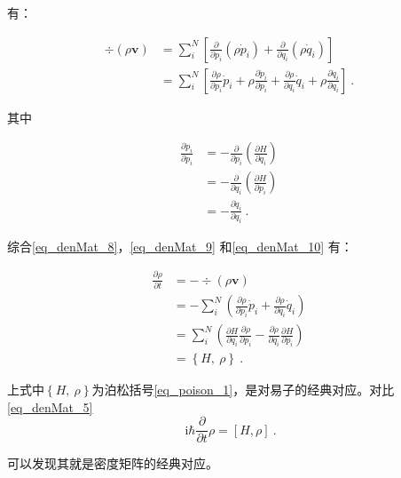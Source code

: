 有：

\begin{equation}\label{eq_denMat_9}
\begin{aligned}
\div\left(\rho\mathbf{v}\right)&= \sum_i^N\left[
    \frac{\partial}{\partial p_i}\left( \rho \dot{p}_i \right) + 
    \frac{\partial}{\partial q_i}\left( \rho \dot{q}_i \right)
    \right] \\
&=\sum_i^N\left[
    \frac{\partial\rho}{\partial p_i}\dot{p}_i +
    \rho \frac{\partial \dot{p}_i}{\partial p_i} +
    \frac{\partial\rho}{\partial q_i}\dot{q}_i +
    \rho \frac{\partial \dot{q}_i}{\partial q_i}
    \right]~.
\end{aligned}~
\end{equation}

其中

\begin{equation}\label{eq_denMat_10}
\begin{aligned}
\frac{\partial \dot{p}_i}{\partial p_i} 
&= -\frac{\partial}{\partial p_i}\left(\frac{\partial H}{\partial q_i}\right) \\
&= -\frac{\partial}{\partial q_i}\left(\frac{\partial H}{\partial p_i}\right) \\
&= -\frac{\partial \dot{q}_i}{\partial q_i}~.
\end{aligned}~
\end{equation}

综合\autoref{eq_denMat_8}，\autoref{eq_denMat_9} 和\autoref{eq_denMat_10} 有：

\begin{equation}
\begin{aligned}
\frac{\partial \rho}{\partial t}&=-\div \left(\rho \mathbf{v}\right) \\
&= - \sum_i^N\left(\frac{\partial \rho}{\partial p_i}\dot{p}_i + \frac{\partial \rho}{\partial q_i}\dot{q}_i\right)\\
&= \sum_i^N\left(\frac{\partial H}{\partial q_i}\frac{\partial \rho}{\partial p_i} - \frac{\partial \rho}{\partial q_i}\frac{\partial H}{\partial p_i}\right) \\
&= \left\{H,~\rho\right\}~.
\end{aligned}~
\end{equation}

上式中$\left\{H,~\rho\right\}$为泊松括号\autoref{eq_poison_1}，是对易子的经典对应。对比\autoref{eq_denMat_5} 
$$\mathrm{i}\hbar \frac{\partial}{\partial t} \rho= \left[ H, \rho \right]~.$$

可以发现其就是密度矩阵的经典对应。

